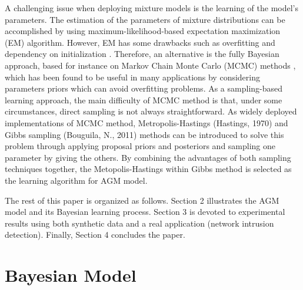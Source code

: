 \documentclass[conference]{llncs}
\begin{document}
A challenging issue when deploying mixture models is the learning of the model's parameters. The estimation of the parameters of mixture distributions can be accomplished by using maximum-likelihood-based expectation maximization (EM) \cite{Dempster1977} algorithm. However, EM has some drawbacks such as overfitting and dependency on initialization \cite{Bouguila2005a,Bouguila2009,Bouguila2012}. Therefore, an alternative is the fully Bayesian approach, based for instance on Markov Chain Monte Carlo (MCMC) methods \cite{Hastings1970}, which has been found to be useful in many applications by considering parameters priors which can avoid overfitting problems. As a sampling-based learning approach, the main difficulty of MCMC method is that, under some circumstances, direct sampling is not always straightforward. As widely deployed implementations of MCMC method, Metropolis-Hastings (Hastings, 1970)\cite{Hastings1970} and Gibbs sampling (Bouguila, N., 2011) \cite{Bouguila2011} methods can be introduced to solve this problem through applying proposal priors and posteriors and sampling one parameter by giving the others. By combining the advantages of both sampling techniques together, the Metopolis-Hastings within Gibbs method \cite{Bouguila2009} \cite{Bourouis2014} is selected as the learning algorithm for AGM model.

The rest of this paper is organized as follows. Section 2 illustrates the AGM model and its Bayesian learning process. Section 3 is devoted to experimental results using both synthetic data and a real application (network intrusion detection). Finally, Section 4 concludes the paper.

\section{Bayesian Model}
\end{document}
